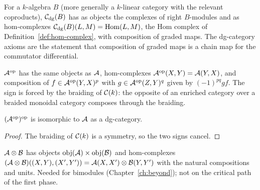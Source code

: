 \begin{example}
\label{ex:dg-complexes}
For a $k$-algebra $B$ (more generally a $k$-linear category with the relevant coproducts),
$\mathcal{C}_{\mathrm{dg}}(B)$ has as objects the complexes of right $B$-modules and as hom-complexes
$\mathcal{C}_{\mathrm{dg}}(B)(L,M) = \operatorname{Hom}(L,M)$, the Hom complex of Definition~\ref{def:hom-complex}, with
composition of graded maps. The dg-category axioms are the statement that composition of
graded maps is a chain map for the commutator differential.
\end{example}

\begin{definition}
\label{def:dg-op}
$\mathcal{A}^{\mathrm{op}}$ has the same objects as $\mathcal{A}$, hom-complexes $\mathcal{A}^{\mathrm{op}}(X,Y) = \mathcal{A}(Y,X)$, and
composition of $f \in \mathcal{A}^{\mathrm{op}}(Y,X)^p$ with $g \in \mathcal{A}^{\mathrm{op}}(Z,Y)^q$ given by
$(-1)^{pq} g f$. The sign is forced by the braiding of $\mathcal{C}(k)$: the opposite of an
enriched category over a braided monoidal category composes through the braiding.
\end{definition}

\begin{lemma}
\label{lem:dg-op-op}
$(\mathcal{A}^{\mathrm{op}})^{\mathrm{op}}$ is isomorphic to $\mathcal{A}$ as a dg-category.
\end{lemma}
\begin{proof}
The braiding of $\mathcal{C}(k)$ is a symmetry, so the two signs cancel.
\end{proof}

\begin{definition}
\label{def:dg-tensor}
\notready
{}
$\mathcal{A} \otimes \mathcal{B}$ has objects $\mathrm{obj}(\mathcal{A}) \times \mathrm{obj}(\mathcal{B})$ and
hom-complexes $(\mathcal{A} \otimes \mathcal{B})((X,Y),(X',Y')) = \mathcal{A}(X,X') \otimes \mathcal{B}(Y,Y')$ with the
natural compositions and units. Needed for bimodules (Chapter~\ref{ch:beyond}); not on the
critical path of the first phase.
\end{definition}
